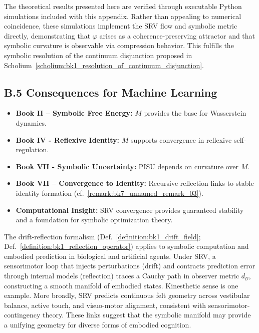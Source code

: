 \begin{remark}
\label{remark:appB_executable_resolution_smoothness}
The theoretical results presented here are verified through executable Python simulations included with this appendix. 
Rather than appealing to numerical coincidence, these simulations implement the SRV flow and symbolic metric directly, 
demonstrating that $\varphi$ arises as a coherence-preserving attractor and that symbolic curvature is observable via compression behavior.
This fulfills the symbolic resolution of the continuum disjunction proposed in Scholium~\ref{scholium:bk1_resolution_of_continuum_disjunction}.
\end{remark}

\subsection*{B.5 Consequences for Machine Learning}
\label{subsec:appB_ml_consequences}

\begin{itemize}
\item \textbf{Book II -- Symbolic Free Energy:} $M$ provides the base for Wasserstein dynamics.
\item \textbf{Book IV - Reflexive Identity:} $M$ supports convergence in reflexive self-regulation.
\item \textbf{Book VII - Symbolic Uncertainty:} PISU depends on curvature over $M$.
\item \textbf{Book VII -- Convergence to Identity:} Recursive reflection links to stable identity formation (cf.~\ref{remark:bk7_unnamed_remark_03}).
\item \textbf{Computational Insight:} SRV convergence provides guaranteed stability and a foundation for symbolic optimization theory.
\end{itemize}

\begin{remark}
\label{remark:appB_embodied_predictive_geometry}
The drift-reflection formalism
(Def.~\ref{definition:bk1_drift_field};
Def.~\ref{definition:bk1_reflection_operator}) applies to symbolic computation
and embodied prediction in biological and artificial agents.
Under SRV, a sensorimotor loop that injects perturbations (drift) and contracts
prediction error through internal models (reflection) traces a Cauchy path in
observer metric $d_{\mathcal{O}}$, constructing a smooth manifold of embodied
states.
Kinesthetic sense is one example.
More broadly, SRV predicts continuous felt geometry across vestibular balance,
active touch, and visuo-motor alignment, consistent with
sensorimotor-contingency theory.
These links suggest that the symbolic manifold may provide a unifying geometry
for diverse forms of embodied cognition.
\end{remark}

